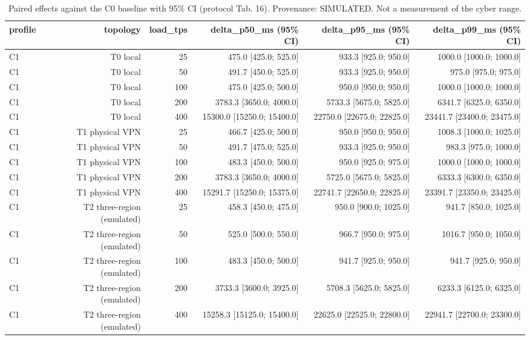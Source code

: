 \begin{table}[t]
\caption{Paired effects against the C0 baseline with 95\% CI (protocol Tab. 16). Provenance: SIMULATED.  Not a measurement of the cyber range.}
\label{tab:table16_effects}
\centering
\begin{tabular}{lrrrrr}
\hline
profile & topology & load\_tps & delta\_p50\_ms (95\% CI) & delta\_p95\_ms (95\% CI) & delta\_p99\_ms (95\% CI) \\
\hline
C1 & T0 local & 25 & 475.0 [425.0; 525.0] & 933.3 [925.0; 950.0] & 1000.0 [1000.0; 1000.0] \\
C1 & T0 local & 50 & 491.7 [450.0; 525.0] & 933.3 [925.0; 950.0] & 975.0 [975.0; 975.0] \\
C1 & T0 local & 100 & 475.0 [425.0; 500.0] & 950.0 [950.0; 950.0] & 1000.0 [1000.0; 1000.0] \\
C1 & T0 local & 200 & 3783.3 [3650.0; 4000.0] & 5733.3 [5675.0; 5825.0] & 6341.7 [6325.0; 6350.0] \\
C1 & T0 local & 400 & 15300.0 [15250.0; 15400.0] & 22750.0 [22675.0; 22825.0] & 23441.7 [23400.0; 23475.0] \\
C1 & T1 physical VPN & 25 & 466.7 [425.0; 500.0] & 950.0 [950.0; 950.0] & 1008.3 [1000.0; 1025.0] \\
C1 & T1 physical VPN & 50 & 491.7 [475.0; 525.0] & 933.3 [925.0; 950.0] & 983.3 [975.0; 1000.0] \\
C1 & T1 physical VPN & 100 & 483.3 [450.0; 500.0] & 950.0 [925.0; 975.0] & 1000.0 [1000.0; 1000.0] \\
C1 & T1 physical VPN & 200 & 3783.3 [3650.0; 4000.0] & 5725.0 [5675.0; 5825.0] & 6333.3 [6300.0; 6350.0] \\
C1 & T1 physical VPN & 400 & 15291.7 [15250.0; 15375.0] & 22741.7 [22650.0; 22825.0] & 23391.7 [23350.0; 23425.0] \\
C1 & T2 three-region (emulated) & 25 & 458.3 [450.0; 475.0] & 950.0 [900.0; 1025.0] & 941.7 [850.0; 1025.0] \\
C1 & T2 three-region (emulated) & 50 & 525.0 [500.0; 550.0] & 966.7 [950.0; 975.0] & 1016.7 [950.0; 1050.0] \\
C1 & T2 three-region (emulated) & 100 & 483.3 [450.0; 500.0] & 941.7 [925.0; 950.0] & 941.7 [925.0; 950.0] \\
C1 & T2 three-region (emulated) & 200 & 3733.3 [3600.0; 3925.0] & 5708.3 [5625.0; 5825.0] & 6233.3 [6125.0; 6325.0] \\
C1 & T2 three-region (emulated) & 400 & 15258.3 [15125.0; 15400.0] & 22625.0 [22525.0; 22800.0] & 22941.7 [22700.0; 23300.0] \\

\end{tabular}
\end{table}
